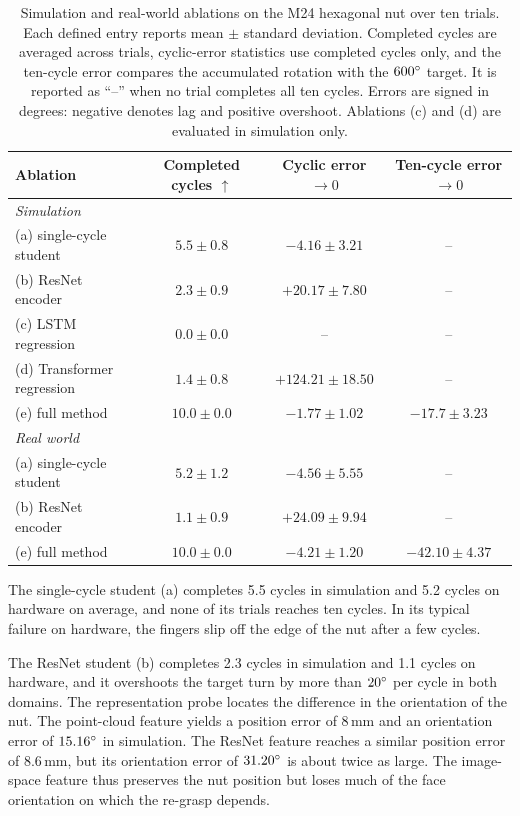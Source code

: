 \begin{table}[htb]%
    \centering%
    \caption{Simulation and real-world ablations on the M24 hexagonal nut over ten trials. Each defined entry reports mean $\pm$ standard deviation. Completed cycles are averaged across trials, cyclic-error statistics use completed cycles only, and the ten-cycle error compares the accumulated rotation with the $600^\circ$ target. It is reported as ``--'' when no trial completes all ten cycles. Errors are signed in degrees: negative denotes lag and positive overshoot. Ablations (c) and (d) are evaluated in simulation only.}%
    \label{tab:ablation}%
    \small
    \begin{tabular}{lccc}
        \toprule
        Ablation & Completed cycles $\uparrow$ & Cyclic error $\rightarrow0$ & Ten-cycle error $\rightarrow0$ \\
        \midrule
        \multicolumn{4}{l}{\emph{Simulation}} \\
        (a) single-cycle student & $5.5\pm0.8$ & $-4.16\pm3.21$ & -- \\
        (b) ResNet encoder & $2.3\pm0.9$ & $+20.17\pm7.80$ & -- \\
        (c) \ac{LSTM} regression & $0.0\pm0.0$ & -- & -- \\
        (d) Transformer regression & $1.4\pm0.8$ & $+124.21\pm18.50$ & -- \\
        (e) full method & $10.0\pm0.0$ & $-1.77\pm1.02$ & $-17.7\pm3.23$ \\
        \midrule
        \multicolumn{4}{l}{\emph{Real world}} \\
        (a) single-cycle student & $5.2\pm1.2$ & $-4.56\pm5.55$ & -- \\
        (b) ResNet encoder & $1.1\pm0.9$ & $+24.09\pm9.94$ & -- \\
        (e) full method & $10.0\pm0.0$ & $-4.21\pm1.20$ & $-42.10\pm4.37$ \\
        \bottomrule
    \end{tabular}
\end{table}%

The single-cycle student (a) completes 5.5 cycles in simulation and 5.2 cycles on hardware on average, and none of its trials reaches ten cycles. In its typical failure on hardware, the fingers slip off the edge of the nut after a few cycles.

The ResNet student (b) completes 2.3 cycles in simulation and 1.1 cycles on hardware, and it overshoots the target turn by more than $20^\circ$ per cycle in both domains. The representation probe locates the difference in the orientation of the nut. The point-cloud feature yields a position error of 8\,mm and an orientation error of $15.16^\circ$ in simulation. The ResNet feature reaches a similar position error of 8.6\,mm, but its orientation error of $31.20^\circ$ is about twice as large. The image-space feature thus preserves the nut position but loses much of the face orientation on which the re-grasp depends.

